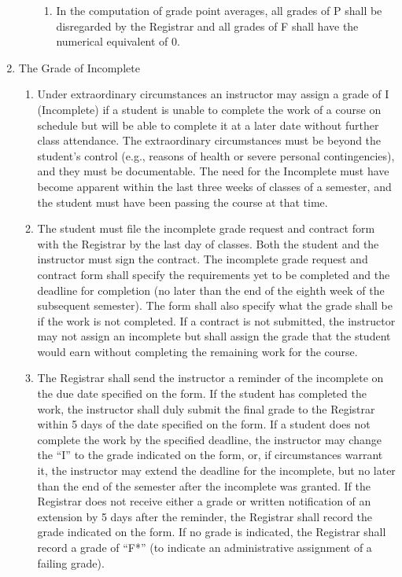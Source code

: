 \documentclass{manual}
\newcommand{\itemLevelA}{\alph*.}
\newcommand{\itemLevelB}{\arabic*)}
\newcommand{\itemLevelC}{\alph*)}
\newcommand{\itemRefA}{\alph*}
\newcommand{\itemRefB}{\arabic*}
\newcommand{\itemRefC}{\alph*}
\begin{document}
\begin{enumerate}[label=\itemLevelA,ref=\itemRefA]
\begin{enumerate}[label=\itemLevelB,ref=\itemRefB]
\begin{enumerate}[label=\itemLevelC,ref=\itemRefC]
\item In the computation of grade point averages, all grades of P shall be disregarded by the Registrar and all grades of F shall have the numerical equivalent of 0. 
\end{enumerate}
\end{enumerate}

\item The Grade of Incomplete

\begin{enumerate}[label=\itemLevelB,ref=\itemRefB]
\item Under extraordinary circumstances an instructor may assign a grade of I (Incomplete) if a student is unable to complete the work of a course on schedule but will be able to complete it at a later date without further class attendance. The extraordinary circumstances must be beyond the student's control (e.g., reasons of health or severe personal contingencies), and they must be documentable. The need for the Incomplete must have become apparent within the last three weeks of classes of a semester, and the student must have been passing the course at that time.

\item The student must file the incomplete grade request and contract form with the Registrar by the last day of classes. Both the student and the instructor must sign the contract. The incomplete grade request and contract form shall specify the requirements yet to be completed and the deadline for completion (no later than the end of the eighth week of the subsequent semester). The form shall also specify what the grade shall be if the work is not completed. If a contract is not submitted, the instructor may not assign an incomplete but shall assign the grade that the student would earn without completing the remaining work for the course.



\item The Registrar shall send the instructor a reminder of the incomplete on the due date specified on the form. If the student has completed the work, the instructor shall duly submit the final grade to the Registrar within 5 days of the date specified on the form. If a student does not complete the work by the specified deadline, the instructor may change the ``I'' to the grade indicated on the form, or, if circumstances warrant it, the instructor may extend the deadline for the incomplete, but no later than the end of the semester after the incomplete was granted. If the Registrar does not receive either a grade or written notification of an extension by 5 days after the reminder, the Registrar shall record the grade indicated on the form. If no grade is indicated, the Registrar shall record a grade of ``F*'' (to indicate an administrative assignment of a failing grade).


\end{enumerate}
\end{enumerate}
\end{document}
